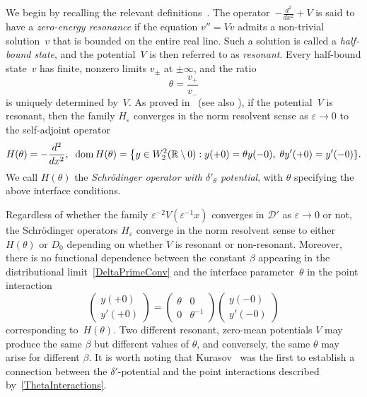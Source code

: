 \documentclass[reqno]{amsart}
\theoremstyle{definition}
\theoremstyle{remark}
\numberwithin{equation}{section}
\newcommand{\dmn}{\mathop{\rm dom}}
\newcommand{\Real}{\mathbb R}
\newcommand{\eps}{\varepsilon}
\newcommand{\cD}{\mathcal{D}}
\begin{document}
We begin by recalling the relevant definitions~\cite{Klaus1982,HintonKlausShaw91a,HintonKlausShaw91b}.
The operator~$-\frac{d^2}{dx^2} + V$ is said to have a \emph{zero-energy resonance} if the equation $v'' = Vv$ admits a non-trivial solution~$v$ that is bounded on the entire real line. Such a solution is called a \emph{half-bound state}, and the potential~$V$ is then referred to as \emph{resonant}. Every half-bound state~$v$ has finite, nonzero limits $v_\pm$ at $\pm\infty$, and the ratio
\begin{equation*}
    \theta = \frac{v_+}{v_-}
\end{equation*}
is uniquely determined by~$V$.
As proved in~\cite{GolovatyHrynivJPA2010} (see also \cite{GolovatyManko2009, GolovatyHrynivProcEdinburgh2013}), if the potential~$V$ is resonant, then the family $H_\eps$ converges in the norm resolvent sense as $\eps \to 0$ to the self-adjoint operator
\begin{equation*}
H(\theta)=-\frac{d^2}{dx^2},\;\; \dmn H(\theta) = \big\{y\in W^2_2(\Real\setminus{0} ): y(+0) = \theta y(-0),\; \theta y'(+0) = y'(-0)\}.
\end{equation*}
We call $H(\theta)$ the \textit{Schr\"odinger operator with $\delta'_\theta$ potential}, with $\theta$ specifying the above interface conditions.

Regardless of whether the family $\eps^{-2} V(\eps^{-1}x)$ converges in $\cD'$ as $\eps\to0$ or not, the Schr\"o\-din\-ger operators $H_\eps$ converge in the norm resolvent sense to either $H(\theta)$ or $D_0$ depending on whether $V$ is resonant or non-resonant. Moreover, there is no functional dependence between the constant $\beta$ appearing in the distributional limit~\eqref{DeltaPrimeConv} and the interface parameter~$\theta$ in the point interaction
\begin{equation}\label{ThetaInteractions}
\begin{pmatrix}
  y(+0)\\ y'(+0)
\end{pmatrix}=
\begin{pmatrix}
  \theta& 0\\
  0 & \theta^{-1}
\end{pmatrix}
\begin{pmatrix}
  y(-0)\\ y'(-0)
\end{pmatrix}
\end{equation}
corresponding to~$H(\theta)$.
Two different resonant, zero-mean potentials $V$ may produce the same $\beta$ but different values of $\theta$, and conversely, the same $\theta$ may arise for different $\beta$. It is worth noting that Kurasov~\cite{KurElaMSI1993, Kurasov1996} was the first to establish a connection between the $\delta'$-potential and the point interactions described by~\eqref{ThetaInteractions}.
\end{document}
